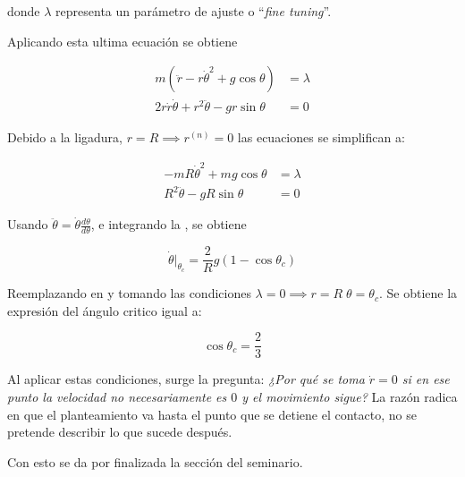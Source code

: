 \documentclass{article}
\theoremstyle{definition}
\begin{document}
donde $\lambda$ representa un parámetro de ajuste o ``\emph{fine tuning}''.

Aplicando esta ultima ecuación se obtiene

\begin{align}
	m \left(\ddot{r} - r \dot{\theta}^2 + g\cos{\theta}\right) &= \lambda \\
	2r\dot{r}\dot{\theta} + r^2\ddot{\theta} - gr\sin{\theta} &= 0
\end{align}

Debido a la ligadura, $r = R \implies r^{(n)} = 0$ las ecuaciones se simplifican a:

\begin{align}
	-mR\dot{\theta}^{2} + mg\cos{\theta} &= \lambda \label{eq:r_equation}\\
	R^2 \ddot{\theta} - gR\sin{\theta} &= 0 \label{eq:critical_theta}
\end{align}

Usando $\ddot{\theta} = \dot{\theta}\frac{d \theta}{d\theta}$, e integrando la , se obtiene

\begin{equation}
	\dot{\theta} |_{\theta_c} = \frac{2}{R} g\left(1 - \cos{\theta_c} \right)
\end{equation}

Reemplazando en  y tomando las condiciones $\lambda = 0 \implies r = R \; \theta = \theta_c$. Se obtiene la expresión del ángulo critico igual a:

\begin{equation}
	\cos{\theta_c} = \frac{2}{3}
\end{equation}

Al aplicar estas condiciones, surge la pregunta: \emph{¿Por qué se toma $\dot{r} = 0$ si en ese punto la velocidad no necesariamente es $0$ y el movimiento sigue?} La razón radica en que el planteamiento va hasta el punto que se detiene el contacto, no se pretende describir lo que sucede después.

Con esto se da por finalizada la sección del seminario.

\printbibliography
\end{document}

